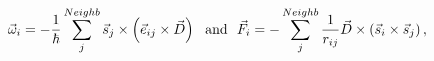 \documentclass[preview]{standalone}
\begin{document}
\begin{varwidth}{50in}
  \begin{equation}
    \vec{\omega}_i = -\frac{1}{\hbar} \sum_{j}^{Neighb} \vec{s}_{j}\times \left(\vec{e}_{ij}\times \vec{D} \right) 
    ~~{\rm and}~~
    \vec{F}_i = -\sum_{j}^{Neighb} \frac{1}{r_{ij}} \vec{D} \times \left( \vec{s}_{i}\times \vec{s}_{j} \right) 
    , \nonumber
  \end{equation}
\end{varwidth}
\end{document}
